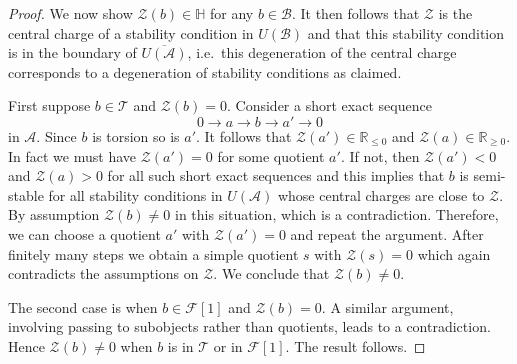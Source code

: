 \documentclass{article}
\theoremstyle{plain}
\theoremstyle{definition}
\theoremstyle{remark}
\newcommand{\ie}{i.e.\ }
\newcommand{\R}{\mathbb{R}}
\newcommand{\U}{\mathbb{H}}
\newcommand{\cat}[1]{\mathcal{#1}}
\begin{document}
\begin{proof}
We now show $\mathcal{Z}(b)\in \U$ for any $b\in \cat{B}$. It then follows that $\mathcal{Z}$ is the central charge of a stability condition in $U(\cat{B})$ and that this stability condition is in the boundary of $\overline{U(\cat{A})}$, \ie this degeneration of the central charge corresponds to a degeneration of stability conditions as claimed. 

First suppose $b\in \cat{T}$ and $\mathcal{Z}(b)=0$. Consider a short exact sequence
$$
0\to a\to b\to a' \to 0
$$
in $\cat{A}$. Since $b$ is torsion so is $a'$. It follows that $\mathcal{Z}(a')\in \R_{\leq 0}$ and $\mathcal{Z}(a)\in \R_{\geq 0}$. In fact we must have $\mathcal{Z}(a')=0$ for some quotient $a'$. If not, then $\mathcal{Z}(a')<0$ and $\mathcal{Z}(a)>0$ for all such short exact sequences and this implies that $b$ is semi-stable for all stability conditions in $U(\cat{A})$ whose central charges are close to $\mathcal{Z}$. By assumption $\mathcal{Z}(b)\neq 0$ in this situation, which is a contradiction. Therefore, we can choose a quotient $a'$ with $\mathcal{Z}(a')=0$ and repeat the argument. After finitely many steps we obtain a simple quotient $s$ with $\mathcal{Z}(s)=0$ which again contradicts the assumptions on $\mathcal{Z}$. We conclude that $\mathcal{Z}(b) \neq 0$.

The second case is when $b\in \cat{F}[1]$ and $\mathcal{Z}(b)=0$. A similar argument, involving passing to subobjects rather than quotients, leads to a contradiction. Hence $\mathcal{Z}(b)\neq 0$ when $b$ is in $\cat{T}$ or in $\cat{F}[1]$. The result follows. 
\end{proof}
\end{document}
